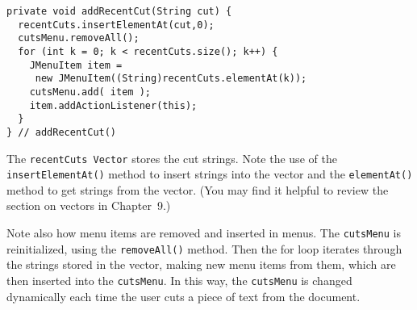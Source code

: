 \begin{jjjlisting}
\begin{lstlisting}
private void addRecentCut(String cut) {
  recentCuts.insertElementAt(cut,0);
  cutsMenu.removeAll();
  for (int k = 0; k < recentCuts.size(); k++) {
    JMenuItem item = 
     new JMenuItem((String)recentCuts.elementAt(k));
    cutsMenu.add( item );
    item.addActionListener(this);
  }
} // addRecentCut()
\end{lstlisting}
\end{jjjlisting}

\noindent The {\tt recentCuts Vector} stores the cut strings. Note
the use of the {\tt insert\-ElementAt()} method to insert strings into the
vector and the {\tt elementAt()} method to get strings from the
vector. (You may find it helpful to review the section on vectors in Chapter~9.)

Note also how menu items are removed and inserted in menus.  The
{\tt cutsMenu} is reinitialized, using the {\tt removeAll()} method.  Then
the for loop iterates through the strings stored in the vector, making
new menu items from them, which are then inserted into the
{\tt cutsMenu}.  In this way, the {\tt cutsMenu} is changed dynamically
each time the user cuts a piece of text from the document.

